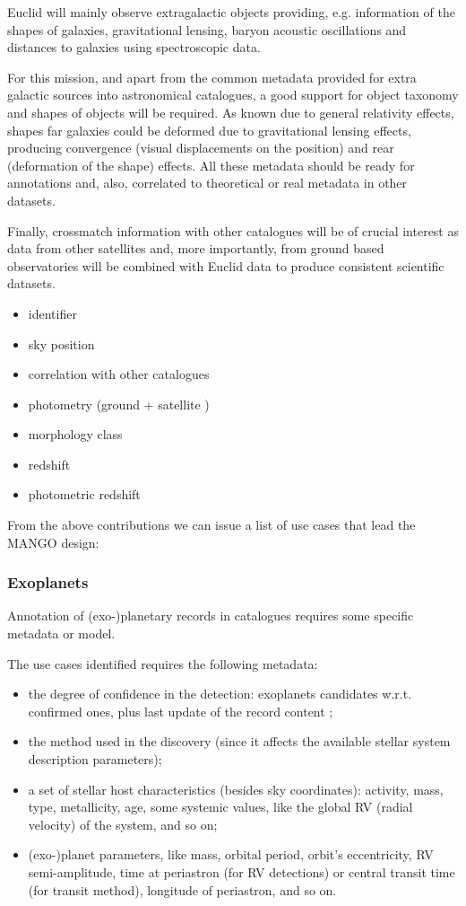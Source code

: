 \documentclass[11pt,a4paper]{ivoa}
\begin{document}
Euclid will mainly observe extragalactic objects providing, e.g. information
of the shapes of galaxies, gravitational lensing,  baryon acoustic oscillations
and distances to galaxies using spectroscopic data.

For this mission, and apart from the common metadata provided for extra galactic
sources into astronomical catalogues, a good support for object taxonomy and
shapes of objects will be required. As known due to general relativity effects,
shapes far galaxies could be deformed due to gravitational lensing effects,
producing convergence (visual displacements on the position) and rear (deformation
of the shape) effects. All these metadata should be ready for annotations and,
also, correlated to theoretical or real metadata in other datasets.

Finally, crossmatch information with other catalogues will be of crucial interest
as data from other satellites and, more importantly, from ground based
observatories will be combined with Euclid data to produce consistent scientific
datasets.

\begin{itemize}[noitemsep,topsep=0pt,parsep=0pt,partopsep=0pt]
    \item identifier
    \item sky position
    \item correlation with other catalogues
    \item photometry (ground + satellite )
    \item morphology class
    \item redshift
    \item photometric redshift
\end{itemize}
From the above contributions we can issue a list of use cases that lead the MANGO design: 

\subsubsection{Exoplanets}
Annotation of (exo-)planetary records in catalogues requires some
specific metadata or model.

The use cases identified requires the following metadata:
\begin{itemize}[noitemsep,topsep=0pt,parsep=0pt,partopsep=0pt]
	\item the degree of confidence in the detection: exoplanets candidates
w.r.t. confirmed ones, plus last update of the record content ;
	\item the method used in the discovery (since it affects the available
stellar system description parameters);
	\item a set of stellar host characteristics (besides sky coordinates):
activity, mass, type,
metallicity, age, some systemic values, like the global RV (radial
velocity) of the system, and so on;
	\item (exo-)planet parameters, like mass, orbital period, orbit's
eccentricity, RV semi-amplitude, time at periastron (for RV detections)
or central transit time (for transit method), longitude of periastron,
and so on.
\end{itemize}
 
\end{document}
